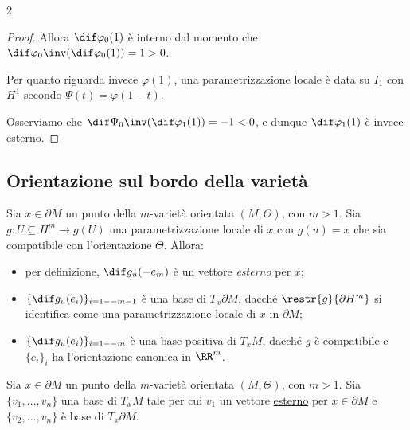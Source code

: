 \begin{multicols*}{2}
\begin{proof}
        Allora $\dif \varphi_0(1)$ è interno dal momento
        che $\dif \varphi_0\inv(\dif \varphi_0(1)) = 1 > 0$. \smallskip

        Per quanto riguarda invece $\varphi(1)$, una parametrizzazione
        locale è data su $I_1$ con $H^1$
        secondo $\Psi(t) = \varphi(1-t)$. \smallskip

        Osserviamo che $\dif \Psi_0\inv (\dif \varphi_1(1)) = -1 < 0$, e dunque
        $\dif \varphi_1(1)$ è invece esterno.
    \end{proof}

    \subsection{Orientazione sul bordo della varietà}

    \begin{remark}
        Sia $x \in \partial M$ un punto della $m$-varietà orientata $(M, \Theta)$, con $m > 1$.
        Sia $g : U \subseteq H^m \to g(U)$ una parametrizzazione locale di $x$ con $g(u) = x$ che
        sia compatibile con l'orientazione $\Theta$. Allora:

        \begin{itemize}
            \item per definizione, $\dif g_u(-e_m)$ è
                  un vettore \textit{esterno} per $x$;
            \item $\{\dif g_u(e_i)\}_{i=1 -- m-1}$ è una base
                  di $T_x \partial M$, dacché $\restr{g}{\partial H^m}$
                  si identifica come una parametrizzazione locale di $x$
                  in $\partial M$;
            \item $\{\dif g_u(e_i)\}_{i=1 -- m}$ è una base positiva
                  di $T_x M$, dacché $g$ è compatibile e $\{e_i\}_i$ ha
                  l'orientazione canonica in $\RR^m$.
        \end{itemize}
    \end{remark}

    \begin{remark}
        Sia $x \in \partial M$ un punto della $m$-varietà orientata $(M, \Theta)$, con $m > 1$.
        Sia $\{v_1, \ldots, v_n\}$ una base di $T_x M$ tale per cui
        $v_1$ un vettore \underline{esterno} per $x \in \partial M$ e
        $\{v_2, \ldots, v_n\}$ è base di $T_x \partial M$. \smallskip


\end{remark}
\end{multicols*}
